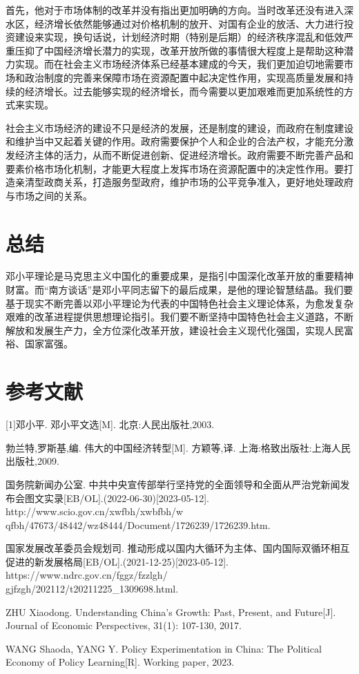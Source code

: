 \documentclass[12pt]{article}
\begin{document}
首先，他对于市场体制的改革并没有指出更加明确的方向。当时改革还没有进入深水区，经济增长依然能够通过对价格机制的放开、对国有企业的放活、大力进行投资建设来实现，换句话说，计划经济时期（特别是后期）的经济秩序混乱和低效严重压抑了中国经济增长潜力的实现，改革开放所做的事情很大程度上是帮助这种潜力实现。而在社会主义市场经济体系已经基本建成的今天，我们更加迫切地需要市场和政治制度的完善来保障市场在资源配置中起决定性作用，实现高质量发展和持续的经济增长。过去能够实现的经济增长，而今需要以更加艰难而更加系统性的方式来实现。

社会主义市场经济的建设不只是经济的发展，还是制度的建设，而政府在制度建设和维护当中又起着关键的作用。政府需要保护个人和企业的合法产权，才能充分激发经济主体的活力，从而不断促进创新、促进经济增长。政府需要不断完善产品和要素价格市场化机制，才能更大程度上发挥市场在资源配置中的决定性作用。要打造亲清型政商关系，打造服务型政府，维护市场的公平竞争准入，更好地处理政府与市场之间的关系。

\section{总结}
邓小平理论是马克思主义中国化的重要成果，是指引中国深化改革开放的重要精神财富。而“南方谈话”是邓小平同志留下的最后成果，是他的理论智慧结晶。我们要基于现实不断完善以邓小平理论为代表的中国特色社会主义理论体系，为愈发复杂艰难的改革进程提供思想理论指引。我们要不断坚持中国特色社会主义道路，不断解放和发展生产力，全方位深化改革开放，建设社会主义现代化强国，实现人民富裕、国家富强。

\section*{参考文献}
[1]邓小平. 邓小平文选[M]. 北京:人民出版社,2003.\par
[2]勃兰特,罗斯基,编. 伟大的中国经济转型[M]. 方颖等,译. 上海:格致出版社:上海人民出版社,2009.\par
[3]国务院新闻办公室. 中共中央宣传部举行坚持党的全面领导和全面从严治党新闻发布会图文实录[EB/OL].(2022-06-30)[2023-05-12]. http://www.scio.gov.cn/xwfbh/xwbfbh/w\\qfbh/47673/48442/wz48444/Document/1726239/1726239.htm.\par
[4]国家发展改革委员会规划司. 推动形成以国内大循环为主体、国内国际双循环相互促进的新发展格局[EB/OL].(2021-12-25)[2023-05-12]. https://www.ndrc.gov.cn/fggz/fzzlgh/\\gjfzgh/202112/t20211225\_1309698.html.\par
[5]ZHU Xiaodong. Understanding China's Growth: Past, Present, and Future[J]. {Journal of Economic Perspectives}, 31(1): 107-130, 2017.\par
[6]WANG Shaoda, YANG Y. Policy Experimentation in China: The Political Economy of Policy Learning[R]. Working paper, 2023.
\end{document}

